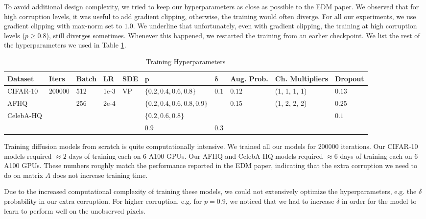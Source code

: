 \documentclass{article}
\begin{document}
To avoid additional design complexity, we tried to keep our hyperparameters as close as possible to the EDM paper. We observed
that for high corruption levels, it was useful to add gradient clipping, otherwise, the training would often diverge. For all our experiments, we use gradient clipping with max-norm set to $1.0$. We underline that unfortunately, even with gradient clipping, the training at high corruption levels ($p\geq 0.8$), still diverges sometimes. Whenever this happened, we restarted the training from an earlier checkpoint. We list the rest of the hyperparameters we used in Table \ref{tab:hyperparams}. 

\begin{table}[h]
\centering
\caption{Training Hyperparameters}
\label{tab:hyperparams}
\scriptsize{
\begin{tabular}{l|l|l|l|l|l|l|l|l|l}
\toprule
\textbf{Dataset} & \textbf{Iters} & \textbf{Batch} & \textbf{LR} & \textbf{SDE} & $\bm{p}$ & $\bm{\delta}$ & \textbf{Aug. Prob.} & \textbf{Ch. Multipliers} & \textbf{Dropout} \\
\midrule
CIFAR-10 & \multirow{4}{*}{$200000$} & 512 & 1e-3 & \multirow{4}{*}{VP} & $\{0.2, 0.4, 0.6, 0.8\}$ & \multirow{3}{*}{$0.1$} & $0.12$ & (1, 1, 1, 1) & $0.13$ \\ \cline{1-1} \cline{3-4} \cline{6-10} 
AFHQ &  & \multirow{3}{*}{256} & \multirow{3}{*}{2e-4} & & $\{0.2, 0.4, 0.6, 0.8, 0.9\}$ & & \multirow{3}{*}{0.15} & \multirow{3}{*}{(1, 2, 2, 2)} & 0.25\\ \cline{1-1} 
\cline{6-7} \cline{10-10}
\multirow{2}{*}{CelebA-HQ } & & & & & $\{0.2, 0.6, 0.8\}$ & & & & \multirow{2}{*}{$0.1$} \\
& & & & & $0.9$ & $0.3$ & & & \\
\bottomrule
\end{tabular}}
\end{table}

Training diffusion models from scratch is quite computationally intensive. We trained all our models for $200000$ iterations. Our CIFAR-10 models required $\approx 2$ days of training each on $6$ A100 GPUs. Our AFHQ and CelebA-HQ models required $\approx 6$ days of training each on $6$ A100 GPUs. These numbers roughly match the performance reported in the EDM paper, indicating that the extra corruption we need to do on matrix $A$ does not increase training time.

Due to the increased computational complexity of training these models, we could not extensively optimize the hyperparameters, e.g. the $\delta$ probability in our extra corruption. For higher corruption, e.g. for $p=0.9$, we noticed that we had to increase $\delta$ in order for the model to learn to perform well on the unobserved pixels.
\end{document}
